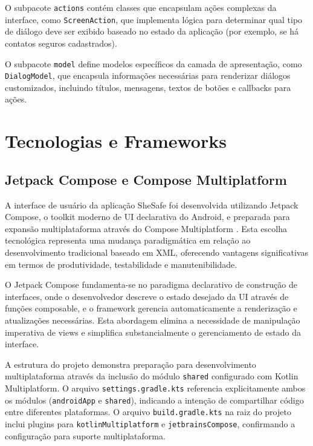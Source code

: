 O subpacote \texttt{actions} contém classes que encapsulam ações complexas da interface, como \texttt{ScreenAction}, que implementa lógica para determinar qual tipo de diálogo deve ser exibido baseado no estado da aplicação (por exemplo, se há contatos seguros cadastrados).

O subpacote \texttt{model} define modelos específicos da camada de apresentação, como \texttt{DialogModel}, que encapsula informações necessárias para renderizar diálogos customizados, incluindo títulos, mensagens, textos de botões e callbacks para ações.

\section{Tecnologias e Frameworks}
\subsection{Jetpack Compose e Compose Multiplatform}
A interface de usuário da aplicação SheSafe foi desenvolvida utilizando Jetpack Compose, o toolkit moderno de UI declarativa do Android, e preparada para expansão multiplataforma através do Compose Multiplatform \cite{google2024compose}. Esta escolha tecnológica representa uma mudança paradigmática em relação ao desenvolvimento tradicional baseado em XML, oferecendo vantagens significativas em termos de produtividade, testabilidade e manutenibilidade.

O Jetpack Compose fundamenta-se no paradigma declarativo de construção de interfaces, onde o desenvolvedor descreve o estado desejado da UI através de funções composable, e o framework gerencia automaticamente a renderização e atualizações necessárias. Esta abordagem elimina a necessidade de manipulação imperativa de views e simplifica substancialmente o gerenciamento de estado da interface.

A estrutura do projeto demonstra preparação para desenvolvimento multiplataforma através da inclusão do módulo \texttt{shared} configurado com Kotlin Multiplatform. O arquivo \texttt{settings.gradle.kts} referencia explicitamente ambos os módulos (\texttt{androidApp} e \texttt{shared}), indicando a intenção de compartilhar código entre diferentes plataformas. O arquivo \texttt{build.gradle.kts} na raiz do projeto inclui plugins para \texttt{kotlinMultiplatform} e \texttt{jetbrainsCompose}, confirmando a configuração para suporte multiplataforma.

